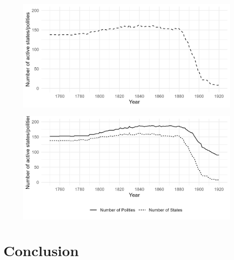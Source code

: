 \documentclass{beamer}
\begin{document}
\begin{frame}
	\begin{figure}
		\includegraphics[width=\linewidth]{img/N_States_Only_Over_Time.png}
	\end{figure}
\end{frame}

\begin{frame}
	\begin{figure}
		\includegraphics[width=\textwidth]{img/N_States_Over_Time.png}
	\end{figure}
\end{frame}

\section{Conclusion}
\end{document}
